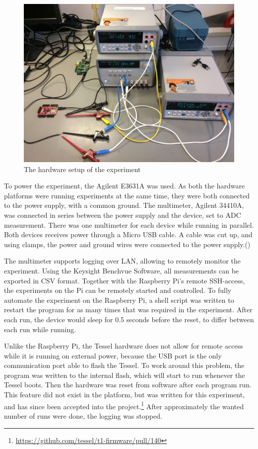 \begin{figure}[ht]
\centering
\includegraphics[width=\textwidth]{fig/pics/setup.jpg}
\caption{The hardware setup of the experiment}
\label{fig:setup}
\end{figure}

To power the experiment, the Agilent E3631A was used. 
As both the hardware platforms were running experiments at the same time, they were both connected to the power supply, with a common ground. 
The multimeter, Agilent 34410A, was connected in series between the power supply and the device, set to ADC measurement. 
There was one multimeter for each device while running in parallel.
Both devices receives power through a Micro USB cable.
A cable was cut up, and using clamps, the power and ground wires were connected to the power supply.(\cite{usbmicro})

The multimeter supports logging over LAN, allowing to remotely monitor the experiment.
Using the Keysight Benchvue Software, all measurements can be exported in CSV format.
Together with the Raspberry Pi's remote SSH-access, the experiments on the Pi can be remotely started and controlled.
To fully automate the experiment on the Raspberry Pi, a shell script was written to restart the program for as many times that was required in the experiment.
After each run, the device would sleep for 0.5 seconds before the reset, to differ between each run while running.

Unlike the Raspberry Pi, the Tessel hardware does not allow for remote access while it is running on external power, because the USB port is the only communication port able to flash the Tessel.
To work around this problem, the program was written to the internal flash, which will start to run whenever the Tessel boots.
Then the hardware was reset from software after each program run.
This feature did not exist in the platform, but was written for this experiment, and has since been accepted into the project.\footnote{\url{https://github.com/tessel/t1-firmware/pull/140}}
After approximately the wanted number of runs were done, the logging was stopped.

